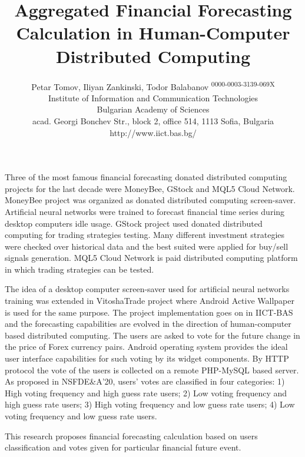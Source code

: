 \documentclass[12pt,a4paper]{article}
\title{\bf Aggregated Financial Forecasting Calculation in Human-Computer Distributed Computing}
\author{Petar Tomov, Iliyan Zankinski, Todor Balabanov \textsuperscript{0000-0003-3139-069X} \\ Institute of Information and Communication Technologies \\ Bulgarian Academy of Sciences \\ acad. Georgi Bonchev Str., block 2, office 514, 1113 Sofia, Bulgaria \\ http://www.iict.bas.bg/}
\date{}
\begin{document}
 

\maketitle 

Three of the most famous financial forecasting donated distributed computing projects for the last decade were MoneyBee, GStock and MQL5 Cloud Network. MoneyBee project was organized as donated distributed computing screen-saver. Artificial neural networks were trained to forecast financial time series during desktop computers idle usage. GStock project used donated distributed computing for trading strategies testing. Many different investment strategies were checked over historical data and the best suited were applied for buy/sell signals generation. MQL5 Cloud Network is paid distributed computing platform in which trading strategies can be tested. 

The idea of a desktop computer screen-saver used for artificial neural networks training was extended in VitoshaTrade project where Android Active Wallpaper is used for the same purpose. The project implementation goes on in IICT-BAS and the forecasting capabilities are evolved in the direction of human-computer based distributed computing. The users are asked to vote for the future change in the price of Forex currency pairs. Android operating system provides the ideal user interface capabilities for such voting by its widget components. By HTTP protocol the vote of the users is collected on a remote PHP-MySQL based server. As proposed in NSFDE\&A'20, users' votes are classified in four categories: 1) High voting frequency and high guess rate users; 2) Low voting frequency and high guess rate users; 3) High voting frequency and low guess rate users; 4) Low voting frequency and low guess rate users.

This research proposes financial forecasting calculation based on users classification and votes given for particular financial future event. 
\end{document}
